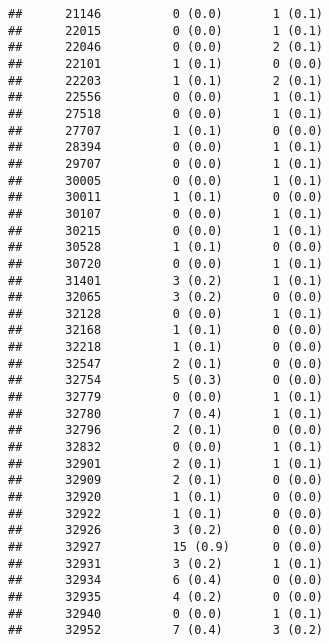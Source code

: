 \documentclass[]{article}
\begin{document}
\begin{verbatim}
##      21146          0 (0.0)       1 (0.1)                        
##      22015          0 (0.0)       1 (0.1)                        
##      22046          0 (0.0)       2 (0.1)                        
##      22101          1 (0.1)       0 (0.0)                        
##      22203          1 (0.1)       2 (0.1)                        
##      22556          0 (0.0)       1 (0.1)                        
##      27518          0 (0.0)       1 (0.1)                        
##      27707          1 (0.1)       0 (0.0)                        
##      28394          0 (0.0)       1 (0.1)                        
##      29707          0 (0.0)       1 (0.1)                        
##      30005          0 (0.0)       1 (0.1)                        
##      30011          1 (0.1)       0 (0.0)                        
##      30107          0 (0.0)       1 (0.1)                        
##      30215          0 (0.0)       1 (0.1)                        
##      30528          1 (0.1)       0 (0.0)                        
##      30720          0 (0.0)       1 (0.1)                        
##      31401          3 (0.2)       1 (0.1)                        
##      32065          3 (0.2)       0 (0.0)                        
##      32128          0 (0.0)       1 (0.1)                        
##      32168          1 (0.1)       0 (0.0)                        
##      32218          1 (0.1)       0 (0.0)                        
##      32547          2 (0.1)       0 (0.0)                        
##      32754          5 (0.3)       0 (0.0)                        
##      32779          0 (0.0)       1 (0.1)                        
##      32780          7 (0.4)       1 (0.1)                        
##      32796          2 (0.1)       0 (0.0)                        
##      32832          0 (0.0)       1 (0.1)                        
##      32901          2 (0.1)       1 (0.1)                        
##      32909          2 (0.1)       0 (0.0)                        
##      32920          1 (0.1)       0 (0.0)                        
##      32922          1 (0.1)       0 (0.0)                        
##      32926          3 (0.2)       0 (0.0)                        
##      32927          15 (0.9)      0 (0.0)                        
##      32931          3 (0.2)       1 (0.1)                        
##      32934          6 (0.4)       0 (0.0)                        
##      32935          4 (0.2)       0 (0.0)                        
##      32940          0 (0.0)       1 (0.1)                        
##      32952          7 (0.4)       3 (0.2)                        

\end{verbatim}
\end{document}
